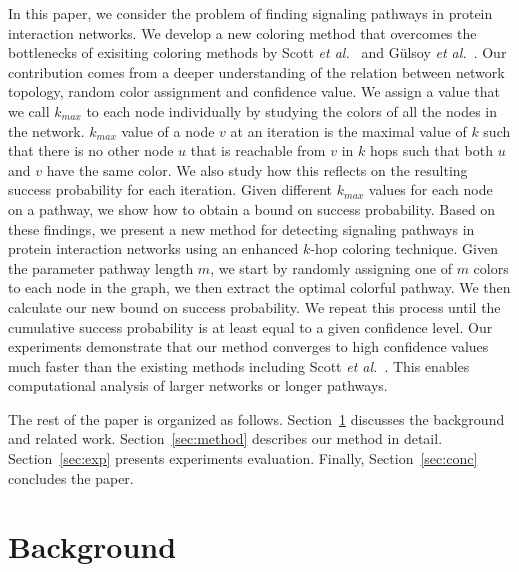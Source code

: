 \documentclass{ws-procs11x85}
\begin{document}
 In this paper, we consider the
problem of finding signaling pathways in protein interaction networks.
We develop a new coloring method that overcomes the bottlenecks of
exisiting coloring methods by Scott {\it et al.}~\cite{scott} and
G{\"u}lsoy {\it et al.}~\cite{gulsoy}. Our contribution comes from a
deeper understanding of the relation between network topology, random
color assignment and confidence value. We assign a value that we call $k_{max}$
to each node individually by studying the colors of all the nodes in
the network. $k_{max}$ value of a node $v$ at an iteration is the
maximal value of $k$ such that there is no other node $u$ that is reachable
from $v$ in $k$ hops such that both $u$ and $v$ have the same color.
 We also study how this reflects on the
resulting success probability for each iteration. Given different
$k_{max}$ values for each node on a pathway, we show how to obtain a
bound on success probability.  Based on these findings, we present a
new method for detecting signaling pathways in protein interaction
networks using an enhanced $k$-hop coloring technique. Given the
parameter pathway length $m$, we start by randomly assigning one of
$m$ colors to each node in the graph, we then extract the optimal
colorful pathway. We then calculate our new bound on success
probability. We repeat this process until the cumulative success
probability is at least equal to a given confidence level. Our
experiments demonstrate that our method converges to high confidence
values much faster than the existing methods including Scott {\it et
  al.}~\cite{scott}. This enables computational analysis of larger
networks or longer pathways.

The rest of the paper is organized as follows. Section~\ref{sec:back}
discusses the background and related work. Section~\ref{sec:method} describes
our method in detail. Section~\ref{sec:exp} presents experiments evaluation.
Finally, Section~\ref{sec:conc} concludes the paper.

\section{Background}
\label{sec:back}
\end{document}
